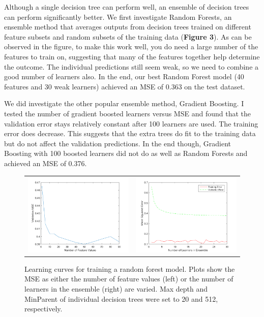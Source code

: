 \documentclass[12pt] {article}
\renewcommand{\baselinestretch}{1.2} %
\begin{document}
\renewcommand{\baselinestretch}{1.2} %
Although a single decision tree can perform well, an ensemble of decision trees can perform significantly better. We first investigate Random Forests, an ensemble method that averages outputs from decision trees trained on different feature subsets and random subsets of the training data (\textbf{Figure 3}). As can be observed in the figure, to make this work well, you do need a large number of the features to train on, suggesting that many of the features together help determine the outcome. The individual predictions still seem weak, so we need to combine a good number of learners also. In the end, our best Random Forest model (40 features and 30 weak learners) achieved an MSE of 0.363 on the test dataset. 

We did investigate the other popular ensemble method, Gradient Boosting. I tested the number of gradient boosted learners versus MSE and found that the validation error stays relatively constant after 100 learners are used. The training error does decrease. This suggests that the extra trees do fit to the training data but do not affect the validation predictions. In the end though, Gradient Boosting with 100 boosted learners did not do as well as Random Forests and achieved an MSE of 0.376.

\renewcommand{\baselinestretch}{1.0} %
\begin{figure}[h!] \centering
\begin{tabular}{cc}
\includegraphics[width=.45\textwidth]{figdir/numFeatValuesVersusMSE.png} &
\includegraphics[width=.45\textwidth]{figdir/numLearnersVersusMSE.png} \\
\end{tabular}
\caption{Learning curves for training a random forest model. Plots show the MSE as either the number of feature values (left) or the number of learners in the ensemble (right) are varied. Max depth and MinParent of individual decision trees were set to 20 and 512, respectively.}
\end{figure}
\renewcommand{\baselinestretch}{1.2} %
\end{document}
